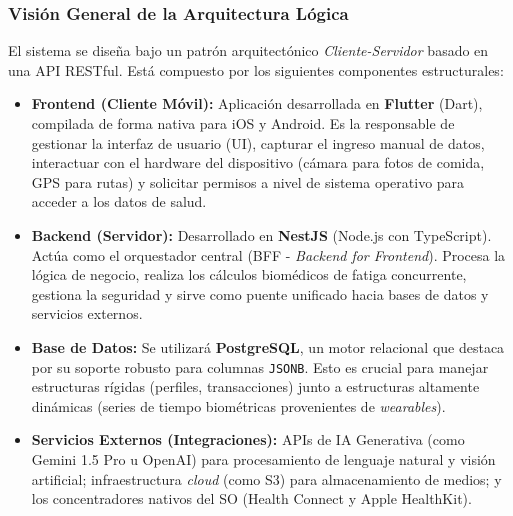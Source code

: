 \documentclass[12pt]{article}
\begin{document}
\subsubsection{Visión General de la Arquitectura Lógica}
El sistema se diseña bajo un patrón arquitectónico \textit{Cliente-Servidor} basado en una API RESTful. Está compuesto por los siguientes componentes estructurales:
\begin{itemize}
    \item \textbf{Frontend (Cliente Móvil):} Aplicación desarrollada en \textbf{Flutter} (Dart), compilada de forma nativa para iOS y Android. Es la responsable de gestionar la interfaz de usuario (UI), capturar el ingreso manual de datos, interactuar con el hardware del dispositivo (cámara para fotos de comida, GPS para rutas) y solicitar permisos a nivel de sistema operativo para acceder a los datos de salud.
    \item \textbf{Backend (Servidor):} Desarrollado en \textbf{NestJS} (Node.js con TypeScript). Actúa como el orquestador central (BFF - \textit{Backend for Frontend}). Procesa la lógica de negocio, realiza los cálculos biomédicos de fatiga concurrente, gestiona la seguridad y sirve como puente unificado hacia bases de datos y servicios externos.
    \item \textbf{Base de Datos:} Se utilizará \textbf{PostgreSQL}, un motor relacional que destaca por su soporte robusto para columnas \texttt{JSONB}. Esto es crucial para manejar estructuras rígidas (perfiles, transacciones) junto a estructuras altamente dinámicas (series de tiempo biométricas provenientes de \textit{wearables}).
    \item \textbf{Servicios Externos (Integraciones):} APIs de IA Generativa (como Gemini 1.5 Pro u OpenAI) para procesamiento de lenguaje natural y visión artificial; infraestructura \textit{cloud} (como S3) para almacenamiento de medios; y los concentradores nativos del SO (Health Connect y Apple HealthKit).
\end{itemize}
\end{document}

